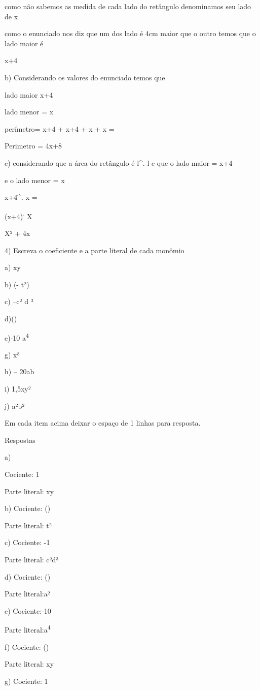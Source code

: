 como não sabemos as medida de cada lado do retângulo denominamos seu
lado de x

como o enunciado nos diz que um dos lado é 4cm maior que o outro temos
que o lado maior é

x+4

b) Considerando os valores do enunciado temos que

lado maior x+4

lado menor = x

perímetro= x+4 + x+4 + x + x =

Perimetro = 4x+8

c) considerando que a área do retângulo é l^{.} l e que
o lado maior = x+4

e o lado menor = x

x+4^{.} x =

(x+4)\textsuperscript{.} X

X² + 4x

4) Escreva o coeficiente e a parte literal de cada monômio

a) xy

b) (- t²)

c) --c² d ³

d)()

e)-10 a\textsuperscript{4}


g) x³

h) -- 20ab

i) 1,5xy²

j) a²b²

Em cada item acima deixar o espaço de 1 linhas para resposta.

Respostas

a)

Cociente: 1

Parte literal: xy

b) Cociente: ()

Parte literal: t²

c) Cociente: -1

Parte literal: c²d³

d) Cociente: ()

Parte literal:a²

e) Cociente:-10

Parte literal:a\textsuperscript{4}

f) Cociente: ()

Parte literal: xy

g) Cociente: 1

